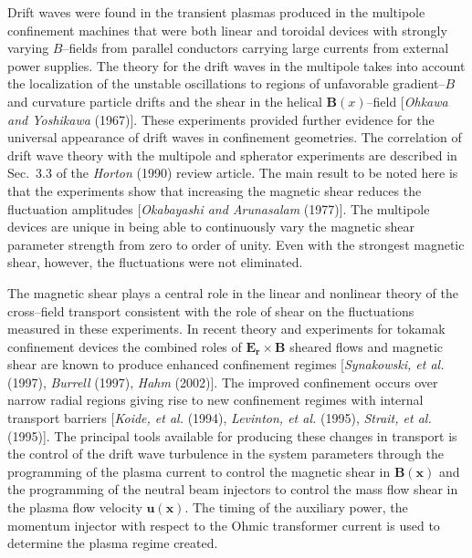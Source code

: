 \documentclass[a4paper,openany,12pt]{book}
\begin{document}
Drift waves were found in the transient plasmas produced in the multipole confinement machines that were both linear and toroidal devices with strongly varying $B$--fields from parallel conductors carrying large currents from external power supplies. The theory for the drift waves in the multipole takes into account the localization of the unstable oscillations to regions of unfavorable gradient--$B$ and curvature particle drifts and the shear in the helical $\bm{B}(x)$--field [\emph{Ohkawa and Yoshikawa} (1967)]. These experiments provided further evidence for the universal appearance of drift waves in confinement geometries. The correlation of drift wave theory with the multipole and spherator experiments are described in Sec.~3.3 of the \emph{Horton} (1990) review article. The main result to be noted here is that the experiments show that increasing the magnetic shear reduces the fluctuation amplitudes [\emph{Okabayashi and Arunasalam} (1977)]. The multipole devices are unique in being able to continuously vary the magnetic shear parameter strength from zero to order of unity. Even with the strongest magnetic shear, however, the fluctuations were not eliminated.

The magnetic shear plays a central role in the linear and nonlinear theory of the cross--field transport consistent with the role of shear on the fluctuations measured in these experiments. In recent theory and experiments for tokamak confinement devices the combined roles of $\bm{E_r\times B}$ sheared flows and magnetic shear are known to produce enhanced confinement regimes [\emph{Synakowski, et al.} (1997), \emph{Burrell} (1997), \emph{Hahm} (2002)]. The improved confinement occurs over narrow radial regions giving rise to new confinement regimes with internal transport barriers [\emph{Koide, et al.} (1994), \emph{Levinton, et al.} (1995), \emph{Strait, et al.} (1995)]. The principal tools available for producing these changes in transport is the control of the drift wave turbulence in the system parameters through the programming of the plasma current to control the magnetic shear in $\bm{B(x)}$ and the programming of the neutral beam injectors to control the mass flow shear in the plasma flow velocity $\bm{u(x)}$. The timing of the auxiliary power, the momentum injector with respect to the Ohmic transformer current is used to determine the plasma regime created.
\end{document}
